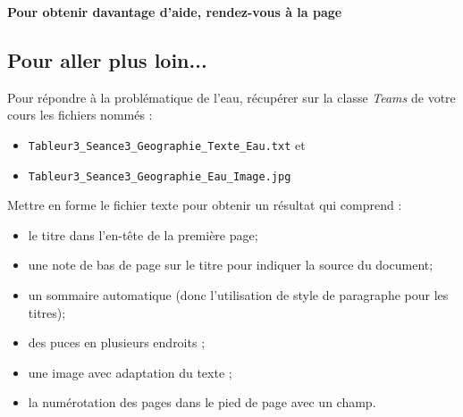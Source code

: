 \vspace{12pt}

\textbf{Pour obtenir davantage d'aide, rendez-vous à la page \pageref{AideTableur03}}

\vfill
\phantom{rien}

\subsection{Pour aller plus loin...}

\vspace{10pt}

Pour répondre à la problématique de l'eau, récupérer sur la classe \emph{Teams} de votre cours les fichiers nommés :
\begin{itemize}
\item \texttt{Tableur3\_Seance3\_Geographie\_Texte\_Eau.txt} et
\item \texttt{Tableur3\_Seance3\_Geographie\_Eau\_Image.jpg}
\end{itemize}

\vspace{12pt}

Mettre en forme le fichier texte pour obtenir un résultat qui comprend :
\begin{itemize}
\item le titre dans l'en-tête de la première page;
\item une note de bas de page sur le titre pour indiquer la source du document;
\item un sommaire automatique (donc l'utilisation de style de paragraphe pour les titres);
\item des puces en plusieurs endroits ;
\item une image avec adaptation du texte ;
\item la numérotation des pages dans le pied de page avec un champ.
\end{itemize}

\vfill
\phantom{rien}






